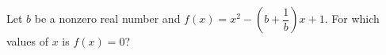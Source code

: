 Let $b$ be a nonzero real number and $f(x)=x^2-\left(b+\dfrac1b\right)x+1$. For which values of $x$ is $f(x)=0$?
